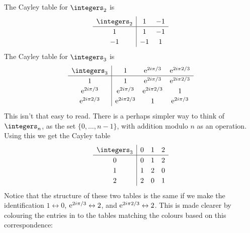 The Cayley table for \(\integers_2\) is
\begin{equation}
    \begin{array}{c|cc}
        \integers_2 & 1  & -1\\ \hline
        1           & 1  & -1\\
        -1          & -1 & 1
    \end{array}
\end{equation}
The Cayley table for \(\integers_3\) is
\begin{equation}
    \renewcommand{\arraystretch}{1.2}
    \begin{array}{c|ccc}
        \integers_3    & 1              & \e^{2i\pi/3}   & \e^{2i\pi 2/3} \\ \hline
        1              & 1              & \e^{2i\pi/3}   & \e^{2i\pi 2/3} \\
        \e^{2i\pi/3}   & \e^{2i\pi/3}   & \e^{2i\pi 2/3} & 1 \\
        \e^{2i\pi 2/3} & \e^{2i\pi 2/3} & 1              & \e^{2i\pi/3}
    \end{array}
\end{equation}
This isn't that easy to read.
There is a perhaps simpler way to think of \(\integers_n\), as the set \(\{0, \dotsc, n-1\}\), with addition modulo \(n\) as an operation.
Using this we get the Cayley table
\begin{equation}
    \begin{array}{c|ccc}
        \integers_3 & 0 & 1 & 2\\ \hline
        0           & 0 & 1 & 2\\
        1           & 1 & 2 & 0\\
        2           & 2 & 0 & 1
    \end{array}
\end{equation}
Notice that the structure of these two tables is the same if we make the identification \(1 \leftrightarrow 0\), \(\mathrm{e}^{2i\pi/3} \leftrightarrow 2\), and \(\mathrm{e}^{2i\pi 2/3} \leftrightarrow 2\).
This is made clearer by colouring the entries in to the tables matching the colours based on this correspondence:
